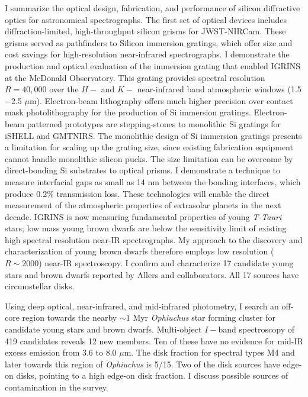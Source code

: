 \documentclass[12pt]{report}	%
\begin{document}
I summarize the optical design, fabrication, and performance of silicon diffractive optics for astronomical spectrographs.  The first set of optical devices includes diffraction-limited, high-throughput silicon grisms for JWST-NIRCam.  These grisms served as pathfinders to Silicon immersion gratings, which offer size and cost savings for high-resolution near-infrared spectrographs.  I demonstrate the production and optical evaluation of the immersion grating that enabled IGRINS at the McDonald Observatory.  This grating provides spectral resolution $R=40,000$ over the $H-$ and $K-$ near-infrared band atmospheric windows (1.5$-$2.5 $\mu$m).  Electron-beam lithography offers much higher precision over contact mask photolithography for the production of Si immersion gratings.  Electron-beam patterned prototypes are stepping-stones to monolithic Si gratings for iSHELL and GMTNIRS.  The monolithic design of Si immersion gratings presents a limitation for scaling up the grating size, since existing fabrication equipment cannot handle monolithic silicon pucks.  The size limitation can be overcome by direct-bonding Si substrates to optical prisms.  I demonstrate a technique to measure interfacial gaps as small as 14 nm between the bonding interfaces, which produce 0.2\% transmission loss.  These technologies will enable the direct measurement of the atmospheric properties of extrasolar planets in the next decade.  IGRINS is now measuring fundamental properties of young \emph{T-Tauri} stars; low mass young brown dwarfs are below the sensitivity limit of existing high spectral resolution near-IR spectrographs.  My approach to the discovery and characterization of young brown dwarfs therefore employs low resolution ($R\sim 2000$) near-IR spectroscopy.  I confirm and characterize 17 candidate young stars and brown dwarfs reported by Allers and collaborators.  All 17 sources have circumstellar disks.

Using deep optical, near-infrared, and mid-infrared photometry, I search an off-core region towards the nearby $\sim1$ Myr \emph{Ophiuchus} star forming cluster for candidate young stars and brown dwarfs.  Multi-object $I-$band spectroscopy of 419 candidates reveals 12 new members.  Ten of these have no evidence for mid-IR excess emission from 3.6 to 8.0 $\mu$m.  The disk fraction for spectral types M4 and later towards this region of \emph{Ophiuchus} is 5/15.  Two of the disk sources have edge-on disks, pointing to a high edge-on disk fraction.  I discuss possible sources of contamination in the survey.
\end{document}
